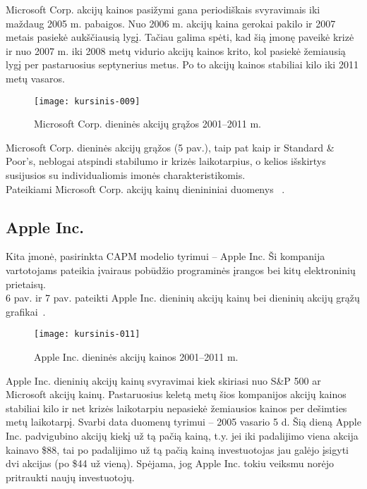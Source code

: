 \documentclass[12pt, a14paper, lithuanian]{article}
\begin{document}
Microsoft Corp. akcijų kainos pasižymi gana periodiškais svyravimais iki maždaug 2005 m. pabaigos. Nuo 2006 m.
akcijų kaina gerokai pakilo ir 2007 metais pasiekė aukščiausią lygį. Tačiau galima spėti, kad šią įmonę paveikė
krizė ir nuo 2007 m. iki 2008 metų vidurio akcijų kainos krito, kol pasiekė žemiausią lygį per pastaruosius septynerius metus. Po to
akcijų kainos stabiliai kilo iki 2011 metų vasaros.

\begin{figure}[H]
  \centering
\texttt{[image: kursinis-009]}
  \caption{Microsoft Corp. dieninės akcijų grąžos 2001--2011 m. }
  \label{fig:5}
\end{figure}
             
Microsoft Corp. dieninės akcijų grąžos (5 pav.), taip pat kaip ir Standard \& Poor's, neblogai atspindi stabilumo ir
krizės laikotarpius, o kelios išskirtys susijusios su individualiomis imonės charakteristikomis. \\

Pateikiami Microsoft Corp. akcijų kainų dienininiai duomenys~\cite{microsoft} .


\subsection{Apple Inc.}

Kita įmonė, pasirinkta CAPM modelio tyrimui -- Apple Inc. Ši kompanija vartotojams pateikia įvairaus pobūdžio programinės įrangos bei kitų elektroninių prietaisų. \\
6 pav. ir 7 pav. pateikti Apple Inc. dieninių akcijų
kainų bei dieninių akcijų grąžų grafikai~\cite{apple}.

\begin{figure}[H]
  \centering
\texttt{[image: kursinis-011]}
  \caption{Apple Inc. dieninės akcijų kainos 2001--2011 m.}
  \label{fig:6}
\end{figure}

Apple Inc. dieninių akcijų kainų svyravimai kiek skiriasi nuo S\&P 500 ar Microsoft akcijų kainų. Pastaruosius
keletą metų šios kompanijos akcijų kainos stabiliai kilo ir net krizės laikotarpiu nepasiekė žemiausios
kainos per dešimties metų laikotarpį. Svarbi data duomenų tyrimui -- 2005 vasario 5 d. Šią dieną Apple Inc.
padvigubino akcijų kiekį už tą pačią kainą, t.y. jei iki padalijimo viena akcija kainavo \$88, tai po padalijimo
už tą pačią kainą investuotojas jau galėjo įsigyti dvi akcijas (po \$44 už vieną). Spėjama, jog Apple Inc.
tokiu veiksmu norėjo pritraukti naujų investuotojų.
\end{document}
